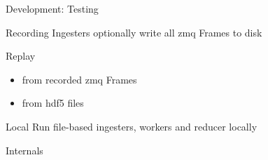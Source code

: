 \documentclass[aspectratio=169]{beamer}
\begin{document}
\begin{frame}{Development: Testing}
 \begin{block}{Recording}
  Ingesters optionally write all zmq Frames to disk
 \end{block}
    
\begin{block}{Replay}
\begin{itemize}
 \item from recorded zmq Frames
 \item from hdf5 files
\end{itemize}
\end{block}

\begin{block}{Local}
 Run file-based ingesters, workers and reducer locally
\end{block}

\end{frame}

\begin{frame}
 \centering
 \Huge {} Internals
\end{frame}
\end{document}

